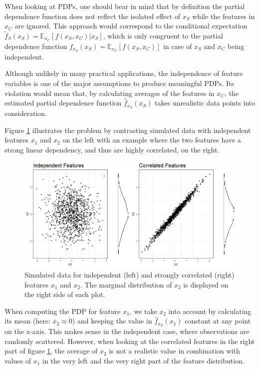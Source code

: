 \documentclass[
]{krantz}
\begin{document}
When looking at PDPs, one should bear in mind that by definition the partial dependence function does not reflect the isolated effect of \(x_S\) while the features in \(x_C\) are ignored. This approach would correspond to the conditional expectation \(\tilde{f}_S(x_S) = \mathbb{E}_{x_C}[f(x_S, x_C)|x_S]\), which is only congruent to the partial dependence function \(f_{x_S}(x_S) = \mathbb{E}_{x_C}[f(x_S, x_C)]\) in case of \(x_S\) and \(x_C\) being independent.\citep{hastie2013elements}

Although unlikely in many practical applications, the independence of feature variables is one of the major assumptions to produce meaningful PDPs. Its violation would mean that, by calculating averages of the features in \(x_C\), the estimated partial dependence function \(\hat{f}_{x_S}(x_S)\) takes unrealistic data points into consideration.\citep{molnar2019}

Figure \ref{fig:Figure01} illustrates the problem by contrasting simulated data with independent features \(x_1\) and \(x_2\) on the left with an example where the two features have a strong linear dependency, and thus are highly correlated, on the right.

\begin{figure}
\includegraphics[width=1\linewidth]{images/VK_PDP_1_Data_ind_dep} \caption{Simulated data for independent (left) and strongly correlated (right) features $x_1$ and $x_2$. The marginal distribution of $x_2$ is displayed on the right side of each plot.}\label{fig:Figure01}
\end{figure}

When computing the PDP for feature \(x_1\), we take \(x_2\) into account by calculating its mean (here: \(\overline{x}_2 \approx 0\)) and keeping the value in \(\hat{f}_{x_S}(x_1)\) constant at any point on the x-axis. This makes sense in the independent case, where observations are randomly scattered. However, when looking at the correlated features in the right part of figure \ref{fig:Figure01}, the average of \(x_2\) is not a realistic value in combination with values of \(x_1\) in the very left and the very right part of the feature distribution.
\end{document}
